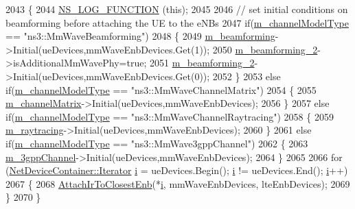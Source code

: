 \begin{DoxyCode}
2043 \{
2044         \hyperlink{log-macros-disabled_8h_a90b90d5bad1f39cb1b64923ea94c0761}{NS\_LOG\_FUNCTION} (\textcolor{keyword}{this});
2045 
2046         \textcolor{comment}{// set initial conditions on beamforming before attaching the UE to the eNBs}
2047         \textcolor{keywordflow}{if}(\hyperlink{classns3_1_1MmWaveHelper_aec88d691230f0db9448a7f953301bb24}{m\_channelModelType} == \textcolor{stringliteral}{"ns3::MmWaveBeamforming"})
2048         \{
2049                 \hyperlink{classns3_1_1MmWaveHelper_a4fa071b6d755f32a684906150660b381}{m\_beamforming}->Initial(ueDevices,mmWaveEnbDevices.Get(1));
2050                 \hyperlink{classns3_1_1MmWaveHelper_a3406a28781481686589a5275787bf43f}{m\_beamforming\_2}->isAdditionalMmWavePhy=\textcolor{keyword}{true};
2051                 \hyperlink{classns3_1_1MmWaveHelper_a3406a28781481686589a5275787bf43f}{m\_beamforming\_2}->Initial(ueDevices,mmWaveEnbDevices.Get(0));
2052         \}
2053         \textcolor{keywordflow}{else} \textcolor{keywordflow}{if}(\hyperlink{classns3_1_1MmWaveHelper_aec88d691230f0db9448a7f953301bb24}{m\_channelModelType} == \textcolor{stringliteral}{"ns3::MmWaveChannelMatrix"})
2054         \{
2055                 \hyperlink{classns3_1_1MmWaveHelper_a731a9e28a12edacd78b96800025db070}{m\_channelMatrix}->Initial(ueDevices,mmWaveEnbDevices);
2056         \}
2057         \textcolor{keywordflow}{else} \textcolor{keywordflow}{if}(\hyperlink{classns3_1_1MmWaveHelper_aec88d691230f0db9448a7f953301bb24}{m\_channelModelType} == \textcolor{stringliteral}{"ns3::MmWaveChannelRaytracing"})
2058         \{
2059                 \hyperlink{classns3_1_1MmWaveHelper_a99e1ebbb84d122ea60a9fe7c1bb44528}{m\_raytracing}->Initial(ueDevices,mmWaveEnbDevices);
2060         \}
2061         \textcolor{keywordflow}{else} \textcolor{keywordflow}{if}(\hyperlink{classns3_1_1MmWaveHelper_aec88d691230f0db9448a7f953301bb24}{m\_channelModelType} == \textcolor{stringliteral}{"ns3::MmWave3gppChannel"})
2062         \{
2063                 \hyperlink{classns3_1_1MmWaveHelper_a1cbb083568aa048da48260725e3cf4a4}{m\_3gppChannel}->Initial(ueDevices,mmWaveEnbDevices);
2064         \}
2065 
2066         \textcolor{keywordflow}{for} (\hyperlink{classns3_1_1NetDeviceContainer_a45709bb572f975569ed985fa89b132f8}{NetDeviceContainer::Iterator} \hyperlink{bernuolliDistribution_8m_a6f6ccfcf58b31cb6412107d9d5281426}{i} = ueDevices.Begin(); 
      \hyperlink{bernuolliDistribution_8m_a6f6ccfcf58b31cb6412107d9d5281426}{i} != ueDevices.End(); \hyperlink{bernuolliDistribution_8m_a6f6ccfcf58b31cb6412107d9d5281426}{i}++)
2067         \{
2068                 \hyperlink{classns3_1_1MmWaveHelper_ac3583459711ca8e019f1a6e58ec37c1f}{AttachIrToClosestEnb}(*\hyperlink{bernuolliDistribution_8m_a6f6ccfcf58b31cb6412107d9d5281426}{i}, mmWaveEnbDevices, lteEnbDevices);
2069         \}
2070 \}
\end{DoxyCode}


